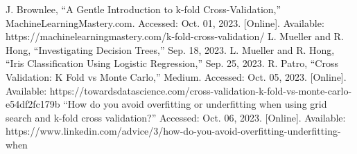 \documentclass[journal]{IEEEtran}
\begin{document}
\begin{thebibliography}{00}
J. Brownlee, “A Gentle Introduction to k-fold Cross-Validation,” MachineLearningMastery.com. Accessed: Oct. 01, 2023. [Online]. Available: https://machinelearningmastery.com/k-fold-cross-validation/
L. Mueller and R. Hong, “Investigating Decision Trees,” Sep. 18, 2023.
L. Mueller and R. Hong, “Iris Classification Using Logistic Regression,” Sep. 25, 2023.
R. Patro, “Cross Validation: K Fold vs Monte Carlo,” Medium. Accessed: Oct. 05, 2023. [Online]. Available: https://towardsdatascience.com/cross-validation-k-fold-vs-monte-carlo-e54df2fc179b
“How do you avoid overfitting or underfitting when using grid search and k-fold cross validation?” Accessed: Oct. 06, 2023. [Online]. Available: https://www.linkedin.com/advice/3/how-do-you-avoid-overfitting-underfitting-when

\end{thebibliography}
\end{document}
